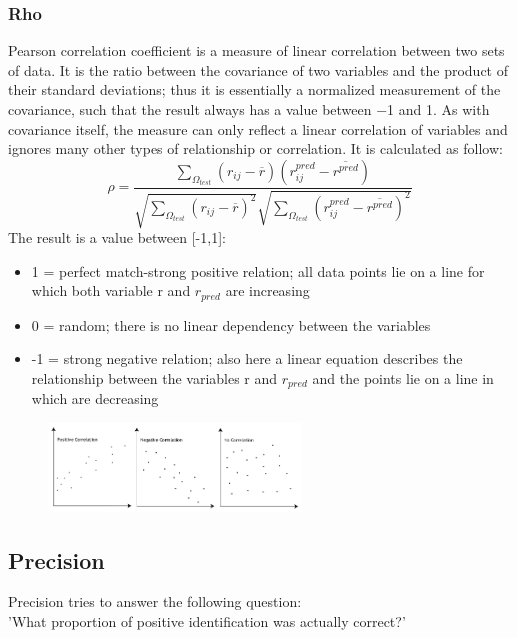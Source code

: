 \documentclass{article}
\begin{document}
\subsubsection{Rho}
Pearson correlation coefficient is a measure of linear correlation between two sets of data. It is the ratio between the covariance of two variables and the product of their standard deviations; thus it is essentially a normalized measurement of the covariance, such that the result always has a value between −1 and 1. As with covariance itself, the measure can only reflect a linear correlation of variables and ignores many other types of relationship or correlation.
It is calculated as follow:
\begin{equation}
      \rho = \frac{\sum_{\Omega_{test}} (r_{ij}-\overline{r})(r_{ij}^{pred}-\overline{r^{pred}})}{{\sqrt{\sum_{\Omega_{test}}(r_{ij}-\overline{r})^2}}{\sqrt{\sum_{\Omega_{test}}(r_{ij}^{pred}-\overline{r^{pred}})^2}}}
\end{equation}
The result is a value between [-1,1]:
\begin{itemize}
      \item 1 = perfect match-strong positive relation; all data points lie on a line for which both variable r and $r_{pred}$ are increasing
      \item 0 = random; there is no linear dependency between the variables
      \item -1 = strong negative relation; also here a linear equation describes the relationship between the variables r and $r_{pred}$ and the points lie on a line in which are decreasing
\end{itemize}
\begin{figure}[ht]
      \begin{center}
            \includegraphics[width=0.6\textwidth]{images/pearson.png}
      \end{center}
\end{figure}

\subsection{Precision}
Precision tries to answer the following question:\\
'What proportion of positive identification was actually correct?'
\end{document}

